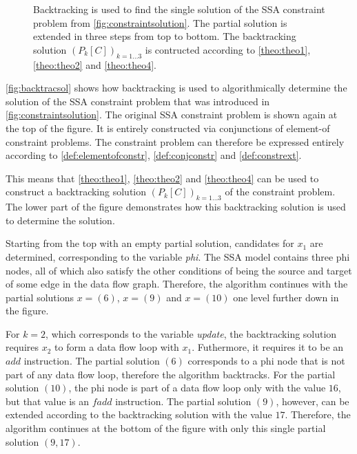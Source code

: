 \begin{figure}[p]
    
    \caption{Backtracking is used to find the single solution of the SSA
             constraint problem from \autoref{fig:constraintsolution}.
             The partial solution is extended in three steps from top to bottom.
             The backtracking solution $(P_k[C])_{k=1\dots3}$ is contructed
             according to \autoref{theo:theo1}, \autoref{theo:theo2} and
             \autoref{theo:theo4}.}
    \label{fig:backtracsol}
\end{figure}

    \autoref{fig:backtracsol} shows how backtracking is used to algorithmically
    determine the solution of the SSA constraint problem that was introduced in
    \autoref{fig:constraintsolution}.
    The original SSA constraint problem is shown again at the top of the figure.
    It is entirely constructed via conjunctions of element-of constraint
    problems.
    The constraint problem can therefore be expressed entirely according to
    \autoref{def:elementofconstr}, \autoref{def:conjconstr} and
    \autoref{def:constrext}.

    This means that \autoref{theo:theo1}, \autoref{theo:theo2} and
    \autoref{theo:theo4} can be used to construct a backtracking solution
    $(P_k[C])_{k=1\dots3}$ of the constraint problem.
    The lower part of the figure demonstrates how this backtracking solution is
    used to determine the solution.

    Starting from the top with an empty partial solution, candidates for $x_1$
    are determined, corresponding to the variable {\em phi}.
    The SSA model contains three phi nodes, all of which also satisfy the other
    conditions of being the source and target of some edge in the data flow
    graph.
    Therefore, the algorithm continues with the partial solutions $x=(6)$,
    $x=(9)$ and $x=(10)$ one level further down in the figure.

    For $k=2$, which corresponds to the variable {\em update}, the backtracking
    solution requires $x_2$ to form a data flow loop with $x_1$.
    Futhermore, it requires it to be an $add$ instruction.
    The partial solution $(6)$ corresponds to a phi node that is not part of
    any data flow loop, therefore the algorithm backtracks.
    For the partial solution $(10)$, the phi node is part of a data flow loop
    only with the value $16$, but that value is an $fadd$ instruction.
    The partial solution $(9)$, however, can be extended according to the
    backtracking solution with the value $17$.
    Therefore, the algorithm continues at the bottom of the figure with only
    this single partial solution $(9,17)$.

